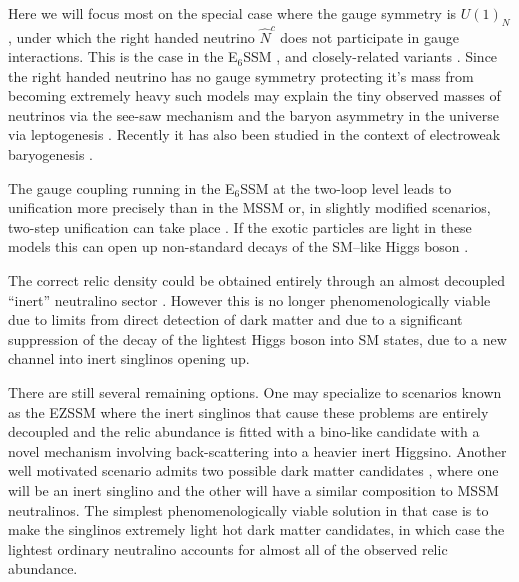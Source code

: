 \documentclass[preprint,amsmath,amssymb,aps,superscriptaddress,prd,
showpacs,floatfix,nofootinbib]{revtex4-1}
\begin{document}
Here we will focus most on the special case where the gauge symmetry
is $U(1)_N$, under which the right handed neutrino $\hat{N}^c$ does not
participate in gauge interactions.  This is the case in the E$_6$SSM
\cite{King:2005jy, King:2005my, Athron:2010zz}, and closely-related variants
\cite{Howl:2007zi, Braam:2009fi, Braam:2010sy, Hall:2011zq, Nevzorov:2012hs,
Athron:2014pua}.  Since the right handed neutrino has no gauge symmetry
protecting it's mass from becoming extremely heavy such models may explain
the tiny observed masses of neutrinos via the see-saw mechanism and the
baryon asymmetry in the universe via leptogenesis \cite{Hambye:2000bn,
King:2008qb, King:2008gw}.  Recently it has also been studied in the context
of electroweak baryogenesis \cite{Chao:2014hya}.

The gauge coupling running in the E$_6$SSM at the two-loop level leads
to unification more precisely than in the MSSM \cite{King:2007uj} or,
in slightly modified scenarios, two-step unification can take place
\cite{Howl:2007hq, Howl:2007zi}.  If the exotic particles are light in
these models this can open up non-standard decays of the SM--like
Higgs boson \cite{Hall:2010ix, Nevzorov:2013tta, Athron:2014pua}.

The correct relic density could be obtained entirely through an almost
decoupled ``inert'' neutralino sector \cite{Hall:2009aj}.  However
this is no longer phenomenologically viable due to limits from direct
detection of dark matter \cite{2011PhRvL.107m1302A, 2012PhRvL.109r1301A,
Akerib:2013tjd} and due to a significant suppression of the decay of the
lightest Higgs boson into SM states, due to a new channel into inert
singlinos opening up.

There are still several remaining options.  One may specialize to
scenarios known as the EZSSM \cite{Hall:2011zq} where the inert
singlinos that cause these problems are entirely decoupled and the
relic abundance is fitted with a bino-like candidate with a novel
mechanism involving back-scattering into a heavier inert
Higgsino.  Another well motivated scenario admits two possible dark
matter candidates \cite{Nevzorov:2012hs}, where one will be an inert
singlino and the other will have a similar composition to MSSM
neutralinos.  The simplest phenomenologically viable solution in that
case is to make the singlinos extremely light hot dark matter
candidates, in which case the lightest ordinary neutralino accounts
for almost all of the observed relic abundance.
\end{document}
